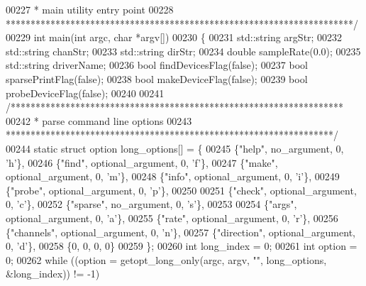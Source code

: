 \begin{DoxyCode}
00227 \textcolor{comment}{ * main utility entry point}
00228 \textcolor{comment}{ **********************************************************************/}
00229 \textcolor{keywordtype}{int} main(\textcolor{keywordtype}{int} argc, \textcolor{keywordtype}{char} *argv[])
00230 \{
00231     std::string argStr;
00232     std::string chanStr;
00233     std::string dirStr;
00234     \textcolor{keywordtype}{double} sampleRate(0.0);
00235     std::string driverName;
00236     \textcolor{keywordtype}{bool} findDevicesFlag(\textcolor{keyword}{false});
00237     \textcolor{keywordtype}{bool} sparsePrintFlag(\textcolor{keyword}{false});
00238     \textcolor{keywordtype}{bool} makeDeviceFlag(\textcolor{keyword}{false});
00239     \textcolor{keywordtype}{bool} probeDeviceFlag(\textcolor{keyword}{false});
00240 
00241     \textcolor{comment}{/*******************************************************************}
00242 \textcolor{comment}{     * parse command line options}
00243 \textcolor{comment}{     ******************************************************************/}
00244     \textcolor{keyword}{static} \textcolor{keyword}{struct }option long\_options[] = \{
00245         \{\textcolor{stringliteral}{"help"}, no_argument, 0, \textcolor{charliteral}{'h'}\},
00246         \{\textcolor{stringliteral}{"find"}, optional_argument, 0, \textcolor{charliteral}{'f'}\},
00247         \{\textcolor{stringliteral}{"make"}, optional_argument, 0, \textcolor{charliteral}{'m'}\},
00248         \{\textcolor{stringliteral}{"info"}, optional_argument, 0, \textcolor{charliteral}{'i'}\},
00249         \{\textcolor{stringliteral}{"probe"}, optional_argument, 0, \textcolor{charliteral}{'p'}\},
00250 
00251         \{\textcolor{stringliteral}{"check"}, optional_argument, 0, \textcolor{charliteral}{'c'}\},
00252         \{\textcolor{stringliteral}{"sparse"}, no_argument, 0, \textcolor{charliteral}{'s'}\},
00253 
00254         \{\textcolor{stringliteral}{"args"}, optional_argument, 0, \textcolor{charliteral}{'a'}\},
00255         \{\textcolor{stringliteral}{"rate"}, optional_argument, 0, \textcolor{charliteral}{'r'}\},
00256         \{\textcolor{stringliteral}{"channels"}, optional_argument, 0, \textcolor{charliteral}{'n'}\},
00257         \{\textcolor{stringliteral}{"direction"}, optional_argument, 0, \textcolor{charliteral}{'d'}\},
00258         \{0, 0, 0,  0\}
00259     \};
00260     \textcolor{keywordtype}{int} long\_index = 0;
00261     \textcolor{keywordtype}{int} option = 0;
00262     \textcolor{keywordflow}{while} ((option = getopt_long_only(argc, argv, \textcolor{stringliteral}{""}, long\_options, &long\_index)) != -1)

\end{DoxyCode}

